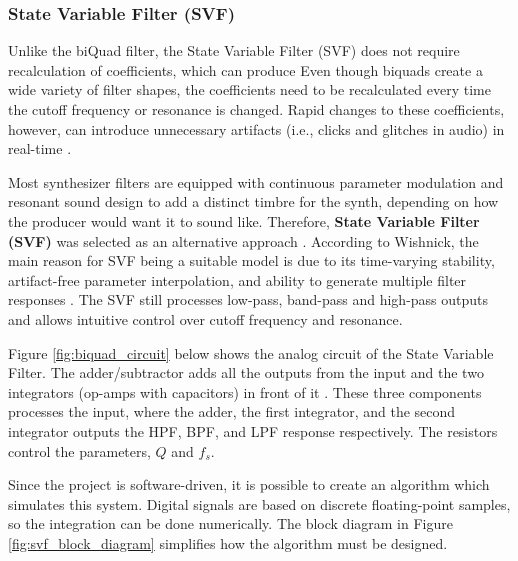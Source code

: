 \subsubsection{State Variable Filter (SVF)}

Unlike the biQuad filter, the State Variable Filter (SVF) does not require recalculation of coefficients, which can
produce 
Even though biquads create a wide variety of filter shapes, the coefficients need to be recalculated every time the 
cutoff frequency or resonance is changed. Rapid changes to these coefficients, however, can introduce unnecessary 
artifacts (i.e., clicks and glitches in audio) in real-time \cite{anthropicclaude}.

Most synthesizer filters are equipped with continuous parameter modulation and resonant sound design to add a distinct 
timbre for the synth, depending on how the producer would want it to sound like. Therefore, 
\textbf{State Variable Filter (SVF)} was selected as an alternative approach \cite{anthropicclaude}. According to 
Wishnick, the main reason for SVF being a suitable model is due to its time-varying stability, artifact-free 
parameter interpolation, and ability to generate multiple filter responses \cite{Wishnick14}.  The SVF still 
processes low-pass, band-pass and high-pass outputs and allows intuitive control over cutoff frequency and 
resonance.

Figure \ref{fig:biquad_circuit} below shows the analog circuit of the State Variable Filter. The adder/subtractor
adds all the outputs from the input and the two integrators (op-amps with capacitors) in front of it \cite{elliott2012statevariable}. 
These three components processes the input, where the adder, the first integrator, and the second integrator 
outputs the HPF, BPF, and LPF response respectively. The resistors control the parameters, $Q$ and $f_s$.



Since the project is software-driven, it is possible to create an algorithm which simulates this system.
Digital signals are based on discrete floating-point samples, so the integration can be done numerically. The 
block diagram in Figure \ref{fig:svf_block_diagram} simplifies how the algorithm must be designed.



